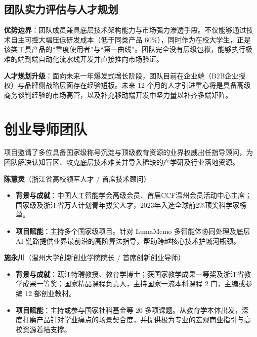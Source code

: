 \subsection{团队实力评估与人才规划}

\textbf{优势边界}：团队成员兼具底层技术架构能力与市场强力渗透手段。不仅能够通过技术自主可控大幅压低研发成本（低于同类产品 60\%），同时作为在校大学生，正是该类工具产品的“重度使用者”与“第一曲线”。团队完全没有层级包袱，能够执行极难的端到端自动化流水线开发并直接推向市场验证。

\textbf{人才规划升级}：面向未来一年爆发式增长阶段，团队目前在企业端（B2B企业授权）与品牌侧战略层面存在经验短板。未来 12 个月的人才引进重心将是具备高级商务谈判经验的市场高管，以及补充移动端开发中坚力量以补齐多端矩阵。

\section{创业导师团队}

项目邀请了多位具备国家级称号沉淀与顶级教育资源的业界权威出任指导顾问，为团队解决认知盲区、攻克底层技术难关并导入稀缺的产学研及行业落地资源。

\textbf{陈慧灵}（浙江省高校领军人才 / 首席技术顾问）
\begin{itemize}
    \item \textbf{背景与成就}：中国人工智能学会高级会员、首届CCF温州会员活动中心主席；国家级及浙江省万人计划青年拔尖人才，2023年入选全球前2\%顶尖科学家榜单。
    \item \textbf{项目赋能}：主持多个国家级项目。针对 LumaMemo 多智能体协同处理及底层 AI 链路提供业界最前沿的高阶算法指导，帮助跨越核心技术护城河瓶颈。
\end{itemize}

\textbf{施永川}（温州大学创新创业学院院长 / 首席创新创业导师）
\begin{itemize}
    \item \textbf{背景与成就}：瓯江特聘教授、教育学博士；获国家教学成果一等奖及浙江省教学成果一等奖；国家精品课程负责人，主持国家一流本科课程 2 门，主编或参编 12 部创业教材。
    \item \textbf{项目赋能}：主持或参与国家社科基金等 20 多项课题。从教育学本体出发，深度打磨产品针对学业痛点的场景契合度，并提供极为专业的宏观商业指引与高校资源着陆支撑。
\end{itemize}

